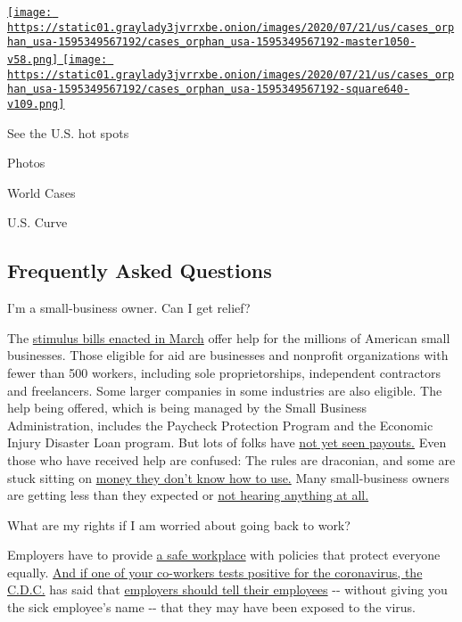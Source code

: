 \href{https://www.nytimes3xbfgragh.onion/interactive/2020/us/coronavirus-us-cases.html}{\texttt{[image: https://static01.graylady3jvrrxbe.onion/images/2020/07/21/us/cases\_orphan\_usa-1595349567192/cases\_orphan\_usa-1595349567192-master1050-v58.png]}
\texttt{[image: https://static01.graylady3jvrrxbe.onion/images/2020/07/21/us/cases\_orphan\_usa-1595349567192/cases\_orphan\_usa-1595349567192-square640-v109.png]}}

See the U.S. hot spots

Photos

World Cases

U.S. Curve

\hypertarget{frequently-asked-questions}{%
\subsection{Frequently Asked
Questions}\label{frequently-asked-questions}}

 I'm a small-business owner. Can I get relief?

The
\href{https://www.nytimes3xbfgragh.onion/article/small-business-loans-stimulus-grants-freelancers-coronavirus.html}{stimulus
bills enacted in March} offer help for the millions of American small
businesses. Those eligible for aid are businesses and nonprofit
organizations with fewer than 500 workers, including sole
proprietorships, independent contractors and freelancers. Some larger
companies in some industries are also eligible. The help being offered,
which is being managed by the Small Business Administration, includes
the Paycheck Protection Program and the Economic Injury Disaster Loan
program. But lots of folks have
\href{https://www.nytimes3xbfgragh.onion/interactive/2020/05/07/business/small-business-loans-coronavirus.html}{not
yet seen payouts.} Even those who have received help are confused: The
rules are draconian, and some are stuck sitting on
\href{https://www.nytimes3xbfgragh.onion/2020/05/02/business/economy/loans-coronavirus-small-business.html}{money
they don't know how to use.} Many small-business owners are getting less
than they expected or
\href{https://www.nytimes3xbfgragh.onion/2020/06/10/business/Small-business-loans-ppp.html}{not
hearing anything at all.}

 What are my rights if I am worried about going back to work?

Employers have to provide
\href{https://www.osha.gov/SLTC/covid-19/standards.html}{a safe
workplace} with policies that protect everyone equally.
\href{https://www.nytimes3xbfgragh.onion/article/coronavirus-money-unemployment.html}{And
if one of your co-workers tests positive for the coronavirus, the
C.D.C.} has said that
\href{https://www.cdc.gov/coronavirus/2019-ncov/community/guidance-business-response.html}{employers
should tell their employees} -\/- without giving you the sick employee's
name -\/- that they may have been exposed to the virus.

